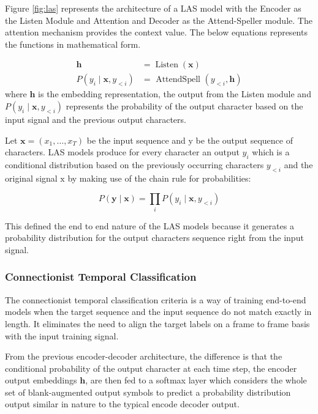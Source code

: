 Figure \ref{fig:las} represents the architecture of a LAS model with the Encoder as the Listen Module and Attention and Decoder as the Attend-Speller module. The attention mechanism provides the context value. The below equations represents the functions in mathematical form.

$$
\begin{aligned}
\mathbf{h} &=\operatorname{Listen}(\mathbf{x}) \\
P\left(y_{i} \mid \mathbf{x}, y_{<i}\right) &=\text { AttendSpell }\left(y_{<i}, \mathbf{h}\right)
\end{aligned}
$$
where $ \mathbf{h}$ is the embedding representation, the output from the Listen module and $P\left(y_{i} \mid \mathbf{x}, y_{<i}\right)$ represents the probability of the output character based on the input signal and the previous output characters.

Let $\mathbf{x}=\left(x_{1}, \ldots, x_{T}\right)$ be the input sequence and $\mathrm{y}$ be the output sequence of characters. LAS models produce for every character an output $y_{i}$ which is a conditional distribution based on the previously occurring characters $y_{<i}$ and the original signal $\mathrm{x}$ by making use of the chain rule for probabilities:

$$
P(\mathbf{y} \mid \mathbf{x})=\prod_{i} P\left(y_{i} \mid \mathbf{x}, y_{<i}\right)
$$

This defined the end to end nature of the LAS models because it generates a probability distribution for the output characters sequence right from the input signal. 

\subsubsection{Connectionist Temporal Classification}
The connectionist temporal classification criteria is a way of training end-to-end models when the target sequence and the input sequence do not match exactly in length. It eliminates the need to align the target labels on a frame to frame basis with the input training signal. 

From the previous encoder-decoder architecture, the difference is that the conditional probability of the output character at each time step, the encoder output embeddings $\mathbf{h}$, are then fed to a softmax layer which considers the whole set of blank-augmented output symbols to predict a probability distribution output similar in nature to the typical encode decoder output.


